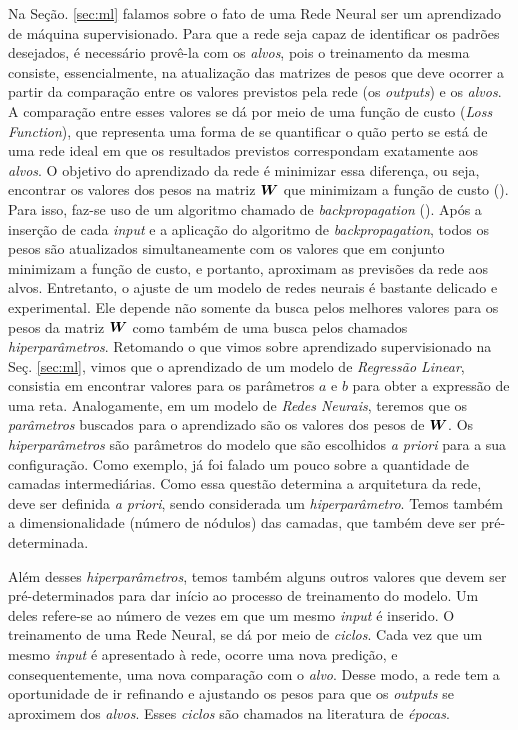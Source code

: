 Na Seção. \ref{sec:ml} falamos sobre o fato de uma Rede Neural ser um aprendizado de máquina supervisionado. Para que a rede seja capaz de identificar os padrões desejados, é necessário provê-la com os \textit{alvos}, pois o treinamento da mesma consiste, essencialmente, na atualização das matrizes de pesos que deve ocorrer a partir da comparação entre os valores previstos pela rede (os \textit{outputs}) e os \textit{alvos}. A comparação entre esses valores se dá por meio de uma função de custo (\textit{Loss Function}), que representa uma forma de se quantificar o quão perto se está de uma rede ideal em que os resultados previstos correspondam exatamente aos \textit{alvos}. O objetivo do aprendizado da rede é minimizar essa diferença, ou seja, encontrar os valores dos pesos na matriz $\bm{W}$ que minimizam a função de custo (\cite{josh:2017}). Para isso, faz-se uso de um algoritmo chamado de \textit{backpropagation} (\cite{Goodfellow-et-al-2016}). Após a inserção de cada \textit{input} e a aplicação do algoritmo de \textit{backpropagation}, todos os pesos são atualizados simultaneamente com os valores que em conjunto minimizam a função de custo, e portanto, aproximam as previsões da rede aos alvos. Entretanto, o ajuste de um modelo de redes neurais é bastante delicado e experimental. Ele depende não somente da busca pelos melhores valores para os pesos da matriz $\bm{W}$ como também de uma busca pelos chamados \textit{hiperparâmetros}. Retomando o que vimos sobre aprendizado supervisionado na Seç. \ref{sec:ml}, vimos que o aprendizado de um modelo de \textit{Regressão Linear}, consistia em encontrar valores para os parâmetros $a$ e $b$ para obter a expressão de uma reta. Analogamente, em um modelo de \textit{Redes Neurais}, teremos que os \textit{parâmetros} buscados para o aprendizado são os valores dos pesos de $\bm{W}$. Os \textit{hiperparâmetros} são parâmetros do modelo que são escolhidos \textit{a priori} para a sua configuração. Como exemplo, já foi falado um pouco sobre a quantidade de camadas intermediárias. Como essa questão determina a arquitetura da rede, deve ser definida \textit{a priori}, sendo considerada um \textit{hiperparâmetro}. Temos também a dimensionalidade (número de nódulos) das camadas, que também deve ser pré-determinada.

Além desses \textit{hiperparâmetros}, temos também alguns outros valores que devem ser pré-determinados para dar início ao processo de treinamento do modelo. Um deles refere-se ao número de vezes em que um mesmo \textit{input} é inserido. O treinamento de uma Rede Neural, se dá por meio de \textit{ciclos}. Cada vez que um mesmo \textit{input} é apresentado à rede, ocorre uma nova predição, e consequentemente, uma nova comparação com o \textit{alvo}. Desse modo, a rede tem a oportunidade de ir refinando e ajustando os pesos para que os \textit{outputs} se aproximem dos \textit{alvos}. Esses \textit{ciclos} são chamados na literatura de \textit{épocas}.

